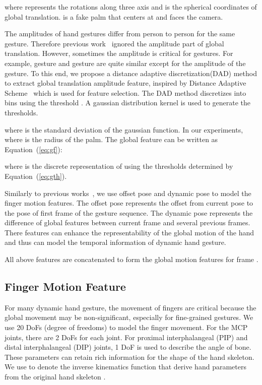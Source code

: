 \documentclass{article}
\begin{document}
where  represents the rotations along three axis and  is the spherical coordinates of global translation.  is a fake palm that centers at  and faces the camera.

The amplitudes of hand gestures differ from person to person for the same gesture. Therefore previous work~\cite{de2016skeleton} ignored the amplitude part  of global translation. However, sometimes the amplitude is critical for gestures. For example, gesture  and gesture  are quite similar except for the amplitude of the gesture. To this end, we propose a distance adaptive discretization(DAD) method to extract global translation amplitude feature, inspired by Distance Adaptive Scheme~\cite{liang2014parsing, dong2015american} which is used for feature selection. The DAD method discretizes  into  bins using the threshold . A gaussian distribution kernel  is used to generate the thresholds.

where  is the standard deviation of the gaussian function. In our experiments,  where  is the radius of the palm. The global feature can be written as Equation~(\ref{eq:gf}):

where  is the discrete representation of  using the thresholds determined by Equation~(\ref{eq:gth}).

Similarly to previous works~\cite{chen2016novel}, we use offset pose  and dynamic pose  to model the finger motion features. The offset pose represents the offset from current pose to the pose of first frame of the gesture sequence. The dynamic pose represents the difference of global features between current frame and several previous frames. There features can enhance the representability of the global motion of the hand and thus can model the temporal information of dynamic hand gesture.


All above features are concatenated to form the global motion features  for frame .

\subsection{Finger Motion Feature}
\label{sec:fingerfeature}
For many dynamic hand gesture, the movement of fingers are critical because the global movement may be non-significant, especially for fine-grained gestures.
We use 20 DoFs (degree of freedoms) to model the finger movement. For the MCP joints, there are 2 DoFs for each joint. For proximal interphalangeal (PIP) and distal interphalangeal (DIP) joints, 1 DoF is used to describe the angle of bone. These parameters can retain rich information for the shape of the hand skeleton. We use  to denote the inverse kinematics function that derive hand parameters from the original hand skeleton .
\end{document}
